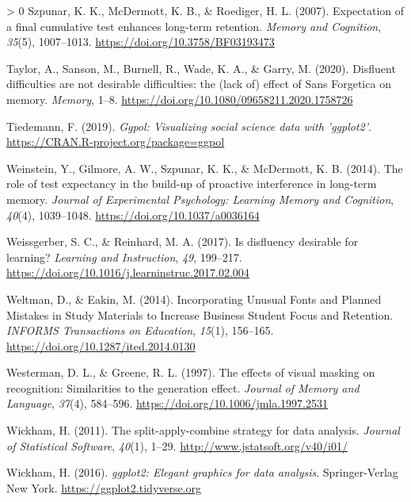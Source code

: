 \documentclass[
  english,
  jou]{apa7}
\newlength{\cslhangindent}
\newenvironment{CSLReferences}[3] %
 {%
  \setlength{\parindent}{0pt}
  \ifodd #1 \everypar{\setlength{\hangindent}{\cslhangindent}}\ignorespaces\fi
  \ifnum #2 > 0
  \setlength{\parskip}{#2\baselineskip}
  \fi
 }%
 {}
\begin{document}
\begin{CSLReferences}{1}{0}
\leavevmode\hypertarget{ref-Szpunar2007}{}%
Szpunar, K. K., McDermott, K. B., \& Roediger, H. L. (2007). {Expectation of a final cumulative test enhances long-term retention}. \emph{Memory and Cognition}, \emph{35}(5), 1007--1013. \url{https://doi.org/10.3758/BF03193473}

\leavevmode\hypertarget{ref-Taylor2020}{}%
Taylor, A., Sanson, M., Burnell, R., Wade, K. A., \& Garry, M. (2020). {Disfluent difficulties are not desirable difficulties: the (lack of) effect of Sans Forgetica on memory}. \emph{Memory}, 1--8. \url{https://doi.org/10.1080/09658211.2020.1758726}

\leavevmode\hypertarget{ref-R-ggpol}{}%
Tiedemann, F. (2019). \emph{Ggpol: Visualizing social science data with 'ggplot2'}. \url{https://CRAN.R-project.org/package=ggpol}

\leavevmode\hypertarget{ref-Weinstein2014}{}%
Weinstein, Y., Gilmore, A. W., Szpunar, K. K., \& McDermott, K. B. (2014). {The role of test expectancy in the build-up of proactive interference in long-term memory}. \emph{Journal of Experimental Psychology: Learning Memory and Cognition}, \emph{40}(4), 1039--1048. \url{https://doi.org/10.1037/a0036164}

\leavevmode\hypertarget{ref-Weissgerber2017}{}%
Weissgerber, S. C., \& Reinhard, M. A. (2017). {Is disfluency desirable for learning?} \emph{Learning and Instruction}, \emph{49}, 199--217. \url{https://doi.org/10.1016/j.learninstruc.2017.02.004}

\leavevmode\hypertarget{ref-Weltman2014}{}%
Weltman, D., \& Eakin, M. (2014). {Incorporating Unusual Fonts and Planned Mistakes in Study Materials to Increase Business Student Focus and Retention}. \emph{INFORMS Transactions on Education}, \emph{15}(1), 156--165. \url{https://doi.org/10.1287/ited.2014.0130}

\leavevmode\hypertarget{ref-Westerman1997}{}%
Westerman, D. L., \& Greene, R. L. (1997). {The effects of visual masking on recognition: Similarities to the generation effect.} \emph{Journal of Memory and Language}, \emph{37}(4), 584--596. \url{https://doi.org/10.1006/jmla.1997.2531}

\leavevmode\hypertarget{ref-R-plyr}{}%
Wickham, H. (2011). The split-apply-combine strategy for data analysis. \emph{Journal of Statistical Software}, \emph{40}(1), 1--29. \url{http://www.jstatsoft.org/v40/i01/}

\leavevmode\hypertarget{ref-R-ggplot2}{}%
Wickham, H. (2016). \emph{ggplot2: Elegant graphics for data analysis}. Springer-Verlag New York. \url{https://ggplot2.tidyverse.org}


\end{CSLReferences}
\end{document}
